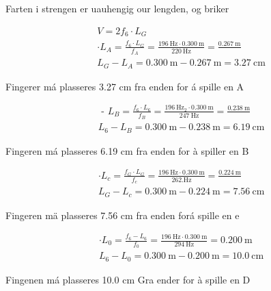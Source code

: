\documentclass[10pt]{article}
\begin{document}
Farten i strengen er uauhengig our lengden, og briker

$$
\begin{aligned}
& V=2 f_{6} \cdot L_{G} \\
& \cdot L_{A}=\frac{f_{6} \cdot L_{G}}{f_{A}}=\frac{196 \mathrm{~Hz} \cdot 0.300 \mathrm{~m}}{220 \mathrm{~Hz}}=\frac{0.267 \mathrm{~m}}{} \\
& L_{G}-L_{A}=0.300 \mathrm{~m}-0.267 \mathrm{~m}=3.27 \mathrm{~cm}
\end{aligned}
$$

Fingerer má plasseres 3.27 cm fra enden for á spille en A

$$
\begin{aligned}
& \text { - } L_{B}=\frac{f_{6} \cdot L_{6}}{f_{B}}=\frac{196 \mathrm{~Hz}_{2} \cdot 0.300 \mathrm{~m}}{247 \mathrm{~Hz}}=\frac{0.238 \mathrm{~m}}{} \\
& L_{6}-L_{B}=0.300 \mathrm{~m}-0.238 \mathrm{~m}=6.19 \mathrm{~cm}
\end{aligned}
$$

Fingeren má plasseres 6.19 cm fra enden for à spiller en B

$$
\begin{aligned}
& \cdot L_{c}=\frac{f_{G} \cdot L_{G}}{f_{c}}=\frac{196 \mathrm{~Hz} \cdot 0.300 \mathrm{~m}}{262 . \mathrm{Hz}}=\frac{0.224 \mathrm{~m}}{} \\
& L_{G}-L_{c}=0.300 \mathrm{~m}-0.224 \mathrm{~m}=7.56 \mathrm{~cm}
\end{aligned}
$$

Fingeren mä plasseres 7.56 cm fra enden forá spille en e

$$
\begin{aligned}
& \cdot L_{0}=\frac{f_{6}-L_{6}}{f_{0}}=\frac{196 \mathrm{~Hz} \cdot 0.300 \mathrm{~m}}{294 \mathrm{~Hz}}=0.200 \mathrm{~m} \\
& L_{6}-L_{0}=0.300 \mathrm{~m}-0.200 \mathrm{~m}=10.0 \mathrm{~cm}
\end{aligned}
$$

Fingenen má plasseres 10.0 cm Gra ender for à spille en D
\end{document}

